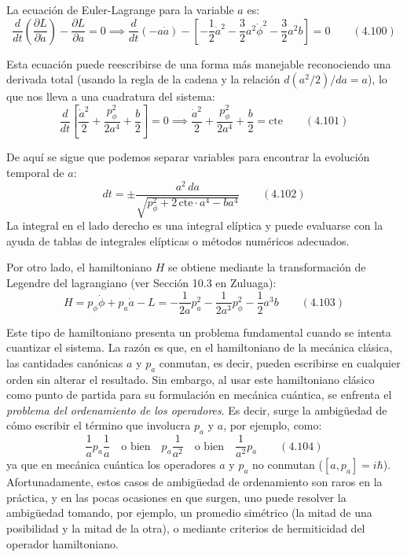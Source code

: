 \documentclass[a4paper]{article}
\begin{document}
La ecuación de Euler-Lagrange para la variable $a$ es:
$$
\frac{d}{dt} \left( \frac{\partial L}{\partial \dot{a}} \right) - \frac{\partial L}{\partial a} = 0 \implies \frac{d}{dt}(-a \dot{a}) - \left[ -\frac{1}{2} \dot{a}^2 - \frac{3}{2} a^2 \dot{\phi}^2 - \frac{3}{2} a^2 b \right] = 0 \qquad (4.100)
$$

Esta ecuación puede reescribirse de una forma más manejable reconociendo una derivada total (usando la regla de la cadena y la relación $d(a^2/2)/da = a$), lo que nos lleva a una cuadratura del sistema:
$$
\frac{d}{dt} \left[ \frac{\dot{a}^2}{2} + \frac{p_\phi^2}{2a^4} + \frac{b}{2} \right] = 0 \implies \frac{\dot{a}^2}{2} + \frac{p_\phi^2}{2a^4} + \frac{b}{2} = \text{cte} \qquad (4.101)
$$

De aquí se sigue que podemos separar variables para encontrar la evolución temporal de $a$:
$$
dt = \pm \frac{a^2 \, da}{\sqrt{p_\phi^2 + 2 \, \text{cte} \cdot a^4 - b a^4}} \qquad (4.102)
$$
La integral en el lado derecho es una integral elíptica y puede evaluarse con la ayuda de tablas de integrales elípticas o métodos numéricos adecuados.

Por otro lado, el hamiltoniano $H$ se obtiene mediante la transformación de Legendre del lagrangiano (ver Sección 10.3 en Zuluaga):
$$
H = p_\phi \dot{\phi} + p_a \dot{a} - L = -\frac{1}{2a} p_a^2 - \frac{1}{2a^3} p_\phi^2 - \frac{1}{2} a^3 b \qquad (4.103)
$$

Este tipo de hamiltoniano presenta un problema fundamental cuando se intenta cuantizar el sistema. La razón es que, en el hamiltoniano de la mecánica clásica, las cantidades canónicas $a$ y $p_a$ conmutan, es decir, pueden escribirse en cualquier orden sin alterar el resultado. Sin embargo, al usar este hamiltoniano clásico como punto de partida para su formulación en mecánica cuántica, se enfrenta el \textit{problema del ordenamiento de los operadores}. Es decir, surge la ambigüedad de cómo escribir el término que involucra $p_a$ y $a$, por ejemplo, como:
$$
\frac{1}{a} p_a \frac{1}{a} \quad \text{o bien} \quad p_a \frac{1}{a^2} \quad \text{o bien} \quad \frac{1}{a^2} p_a \qquad (4.104)
$$
ya que en mecánica cuántica los operadores $a$ y $p_a$ no conmutan ($[a, p_a] = i\hbar$). Afortunadamente, estos casos de ambigüedad de ordenamiento son raros en la práctica, y en las pocas ocasiones en que surgen, uno puede resolver la ambigüedad tomando, por ejemplo, un promedio simétrico (la mitad de una posibilidad y la mitad de la otra), o mediante criterios de hermiticidad del operador hamiltoniano.
\end{document}
